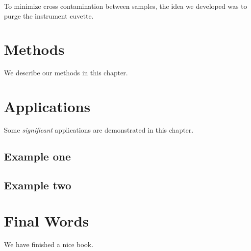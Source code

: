 \documentclass[]{book}
\begin{document}
To minimize cross contamination between samples, the idea we developed was to purge the instrument cuvette.

\hypertarget{methods}{%
\chapter{Methods}\label{methods}}

We describe our methods in this chapter.

\hypertarget{applications}{%
\chapter{Applications}\label{applications}}

Some \emph{significant} applications are demonstrated in this chapter.

\hypertarget{example-one}{%
\section{Example one}\label{example-one}}

\hypertarget{example-two}{%
\section{Example two}\label{example-two}}

\hypertarget{final-words}{%
\chapter{Final Words}\label{final-words}}

We have finished a nice book.


\end{document}
